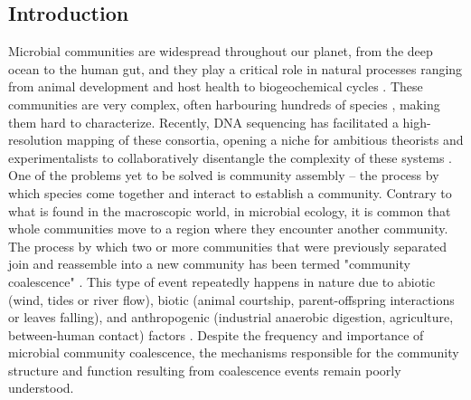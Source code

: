 \documentclass[titlepage,11pt]{article}
\begin{document}
\begin{linenumbers}
\begin{singlespace}
		\section{Introduction}
			Microbial communities are widespread throughout our planet, from the deep ocean to the human gut, and they play a critical role in natural processes ranging from animal development and host health \citep{Huttenhower2012} to biogeochemical cycles \citep{Falkowski2008}. These communities are very complex, often harbouring hundreds of species \citep{Gilbert2014}, making them hard to characterize. Recently, DNA sequencing has facilitated a high-resolution mapping of these consortia, opening a niche for ambitious theorists and experimentalists to collaboratively disentangle the complexity of these systems \citep{Marsland2019, Goldford2018, Goyal2018, Friedman2017, Costello2012}. One of the problems yet to be  solved is community assembly -- the process by which species come together and interact to establish a community. Contrary to what is found in the macroscopic world, in microbial ecology, it is common that whole communities move to a region where they encounter another community. The process by which two or more communities that were previously separated join and reassemble into a new community has been termed "community coalescence" \citep{Rillig2015}. This type of event repeatedly happens in nature due to abiotic (wind, tides or river flow), biotic (animal courtship, parent-offspring interactions or leaves falling), and anthropogenic (industrial anaerobic digestion, agriculture, between-human contact) factors \citep{Castledine2020}. Despite the frequency and importance of microbial community coalescence, the mechanisms responsible for the community structure and function resulting from coalescence events remain poorly understood.\\

\end{singlespace}
\end{linenumbers}
\end{document}
